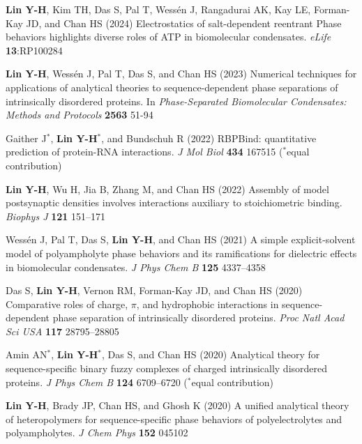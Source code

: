 \documentclass[11pt]{../yhlcv}
\def\tname#1{{\bf #1}}
\begin{document}
\begin{etaremune}[leftmargin=0.26in]

\item
\tname{Lin Y-H}, Kim TH, Das S, Pal T, Wessén J, Rangadurai AK, Kay LE, Forman-Kay JD, and Chan HS (2024)
Electrostatics of salt-dependent reentrant Phase behaviors highlights diverse roles of ATP in biomolecular condensates.
{\it eLife} {\bf 13}:RP100284


\item
\tname{Lin Y-H}, Wessén J, Pal T, Das S, and Chan HS (2023)
Numerical techniques for applications of analytical theories to sequence-dependent phase separations of intrinsically disordered proteins.
In {\it Phase-Separated Biomolecular Condensates: Methods and Protocols} {\bf 2563} 51-94

\item
Gaither J$^*$, \tname{Lin Y-H}$^*$, and Bundschuh R (2022)
RBPBind: quantitative prediction of protein-RNA interactions.
{\it J Mol Biol} {\bf 434} 167515
($^*$equal contribution)

\item 
\tname{Lin Y-H}, Wu H, Jia B, Zhang M, and Chan HS (2022)
Assembly of model postsynaptic densities involves interactions auxiliary to stoichiometric binding.
{\it Biophys J} {\bf 121} 151--171

\item 
Wessén J, Pal T, Das S, \tname{Lin Y-H}, and Chan HS (2021)
A simple explicit-solvent model of polyampholyte phase behaviors and its ramifications for dielectric effects in biomolecular condensates.
{\it J Phys Chem B} {\bf 125} 4337--4358 %

\item 
Das S, \tname{Lin Y-H}, Vernon RM, Forman-Kay JD, and Chan HS (2020)
Comparative roles of charge, $\pi$, and hydrophobic interactions in sequence-dependent phase separation of intrinsically disordered proteins.
{\it Proc Natl Acad Sci USA} {\bf 117} 28795--28805

\item 
Amin AN$^*$, \tname{Lin Y-H}$^*$, Das S, and Chan HS (2020)
Analytical theory for sequence-specific binary fuzzy complexes of charged intrinsically disordered proteins.
{\it J Phys Chem B} 
{\bf 124} 6709--6720
($^*$equal contribution) %

\item
\tname{Lin Y-H}, Brady JP, Chan HS, and Ghosh K (2020)
A unified analytical theory of heteropolymers for sequence-specific phase behaviors of polyelectrolytes and polyampholytes. 
{\it J Chem Phys} {\bf 152} 045102


\end{etaremune}
\end{document}
